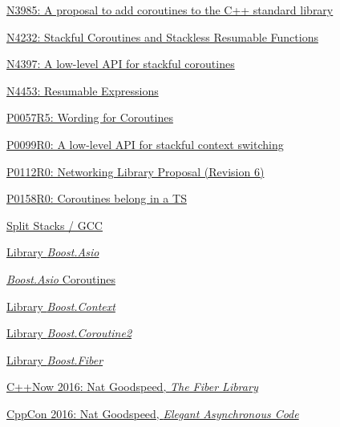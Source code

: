 \begin{thebibliography}{99}

        \href{http://www.open-std.org/jtc1/sc22/wg21/docs/papers/2014/n3985.pdf}
        {N3985: A proposal to add coroutines to the C++ standard library}

        \href{http://www.open-std.org/jtc1/sc22/wg21/docs/papers/2014/n4232.pdf}
        {N4232: Stackful Coroutines and Stackless Resumable Functions}

        \href{http://www.open-std.org/jtc1/sc22/wg21/docs/papers/2015/n4397.pdf}
        {N4397: A low-level API for stackful coroutines}

        \href{http://www.open-std.org/jtc1/sc22/wg21/docs/papers/2015/n4453.pdf}
        {N4453: Resumable Expressions}

        \href{http://www.open-std.org/jtc1/sc22/wg21/docs/papers/2016/p0057r5.pdf}
        {P0057R5: Wording for Coroutines}

        \href{http://www.open-std.org/jtc1/sc22/wg21/docs/papers/2015/p0099r0.pdf}
        {P0099R0: A low-level API for stackful context switching}

        \href{http://www.open-std.org/jtc1/sc22/wg21/docs/papers/2015/p0112r0.html}
        {P0112R0: Networking Library Proposal (Revision 6)}

        \href{http://www.open-std.org/jtc1/sc22/wg21/docs/papers/2015/p0158r0.html}
        {P0158R0: Coroutines belong in a TS}

        \href{http://gcc.gnu.org/wiki/SplitStacks}
        {Split Stacks / GCC}

        \href{http://www.boost.org/doc/libs/release/doc/html/boost\_asio.html}
        {Library \emph{Boost.Asio}}

        \href{http://www.boost.org/doc/libs/release/doc/html/boost_asio/reference/coroutine.html}
        {\emph{Boost.Asio} Coroutines}

        \href{http://www.boost.org/doc/libs/release/libs/context/doc/html/index.html}
        {Library \emph{Boost.Context}}

        \href{http://www.boost.org/doc/libs/release/libs/coroutine2/doc/html/index.html}
        {Library \emph{Boost.Coroutine2}}

        \href{http://www.boost.org/doc/libs/release/libs/fiber/doc/html/index.html}
        {Library \emph{Boost.Fiber}}

        \href{https://www.youtube.com/watch?v=gcNphOWuUb0}
        {C++Now 2016: Nat Goodspeed, \emph{The Fiber Library}}

        \href{https://www.youtube.com/watch?v=e-NUmyBou8Q}
        {CppCon 2016: Nat Goodspeed, \emph{Elegant Asynchronous Code}}

\end{thebibliography}

